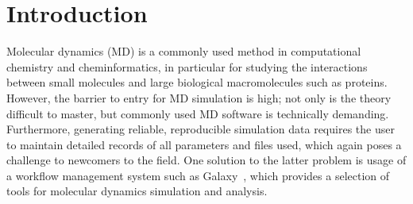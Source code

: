 \documentclass[twocolumn]{bmcart}%
\begin{document}
\begin{frontmatter}
\begin{abstractbox}
\begin{keyword}
\end{keyword}


\end{abstractbox}
%

\end{frontmatter}






\hypertarget{introduction}{%
\section*{Introduction}\label{introduction}}

Molecular dynamics (MD) is a commonly used method in computational chemistry and cheminformatics, in particular for studying the interactions between small molecules and large biological macromolecules such as proteins.~\cite{berendsen01} However, the barrier to entry for MD simulation is high; not only is the theory difficult to master, but commonly used MD software is technically demanding. Furthermore, generating reliable, reproducible simulation data requires the user to maintain detailed records of all parameters and files used, which again poses a challenge to newcomers to the field. One solution to the latter problem is usage of a workflow management system such as Galaxy~\cite{afgan_galaxy_2018}, which provides a selection of tools for molecular dynamics simulation and analysis.
\end{document}
